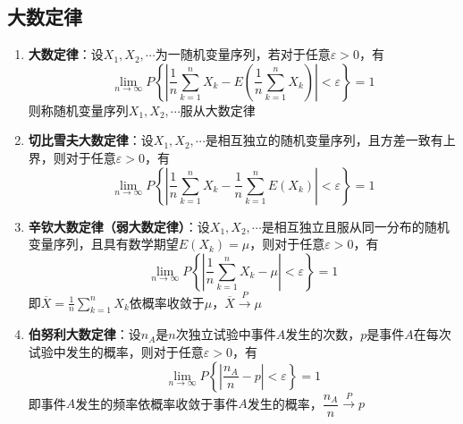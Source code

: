 \documentclass[12pt,a4paper,UTF8]{book}
\begin{document}
\subsection{大数定律}
\begin{enumerate}
\item \textbf{大数定律}：设$X_1,X_2,\cdots$为一随机变量序列，若对于任意$\varepsilon>0$，有
\[\lim\limits_{n\to\infty}P\left\{\left|\frac{1}{n}\sum\limits_{k=1}^{n}X_k-E\left(\frac{1}{n}\sum\limits_{k=1}^{n}X_k\right)\right|<\varepsilon\right\}=1\]
则称随机变量序列$X_1,X_2,\cdots$服从大数定律
\item \textbf{切比雪夫大数定律}：设$X_1,X_2,\cdots$是相互独立的随机变量序列，且方差一致有上界，则对于任意$\varepsilon>0$，有
\[\lim\limits_{n\to\infty}P\left\{\left|\frac{1}{n}\sum\limits_{k=1}^{n}X_k-\frac{1}{n}\sum\limits_{k=1}^{n}E\left(X_k\right)\right|<\varepsilon\right\}=1\]
\item \textbf{辛钦大数定律（弱大数定律）}：设$X_1,X_2,\cdots$是相互独立且服从同一分布的随机变量序列，且具有数学期望$E\left(X_k\right)=\mu$，则对于任意$\varepsilon>0$，有
\[\lim\limits_{n\to\infty}P\left\{\left|\frac{1}{n}\sum\limits_{k=1}^{n}X_k-\mu\right|<\varepsilon\right\}=1\]
即$\overline{X}=\frac{1}{n}\sum\limits_{k=1}^{n}X_k$依概率收敛于$\mu$，$\overline{X}\xrightarrow{\ P\ }\mu$
\item \textbf{伯努利大数定律}：设$n_A$是$n$次独立试验中事件$A$发生的次数，$p$是事件$A$在每次试验中发生的概率，则对于任意$\varepsilon>0$，有
\[\lim\limits_{n\to\infty}P\left\{\left|\frac{n_A}{n}-p\right|<\varepsilon\right\}=1\]
即事件$A$发生的频率依概率收敛于事件$A$发生的概率，$\dfrac{n_A}{n}\xrightarrow{\ P\ }p$
\end{enumerate}
\end{document}
